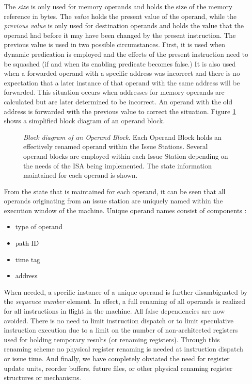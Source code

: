 \documentclass[10pt,dvips]{article}
\begin{document}
The \textit{size} is only used for memory operands and holds
the size of the memory reference in bytes.
The \textit{value} holds the present value of the operand,
while the \textit{previous value} is only used for destination
operands and holds the value that the operand
had before it may have been changed by the present instruction.
The previous value is used in two possible circumstances.
First, it is used when dynamic predication is
employed and the effects of the present instruction need to be
squashed (if and when its enabling predicate becomes false.)
It is also used when a forwarded operand with a specific
address was incorrect 
and there is no expectation that a later instance
of that operand with the same address will be forwarded.
This situation occurs when addresses for memory operands are
calculated but are later determined to be incorrect.
An operand with the old address is forwarded with the previous
value to correct the situation.
Figure \ref{fig:operand} shows a simplified block diagram of
an operand block.
%
\begin{figure}
\centering
{}
\caption{{\em Block diagram of an Operand Block.} 
Each Operand Block holds an effectively renamed 
operand within the Issue Stations.
Several operand blocks are employed within each Issue Station
depending on the needs of the ISA being implemented.
The state information maintained for each operand
is shown.}
\label{fig:operand}
\end{figure}
%

From the state that is maintained for each operand, it can be seen
that 
all operands originating from an issue station
are uniquely named within the
execution window of the machine.
Unique operand names consist of components :
%
\begin{itemize}
\vspace{-0.10in}
\item{type of operand}
\vspace{-0.10in}
\item{path ID}
\vspace{-0.10in}
\item{time tag}
\vspace{-0.10in}
\item{address}
\vspace{-0.10in}
\end{itemize}   
%
When needed, a specific instance of a unique operand
is further disambiguated by the \textit{sequence number} element.
In effect,
a full renaming of
all operands is realized for all instructions
in flight in the machine.  
All false dependencies are now avoided.
There is no need to limit instruction dispatch or to limit speculative
instruction execution due to a limit on the number of non-architected
registers used for holding temporary results (or renaming registers).
Through this renaming scheme
no physical register renaming is needed at instruction dispatch
or issue time.  
And finally, we have completely obviated the need for
register update units, reorder buffers, future files, or other physical 
renaming register structures or mechanisms.
%
%
\end{document}

